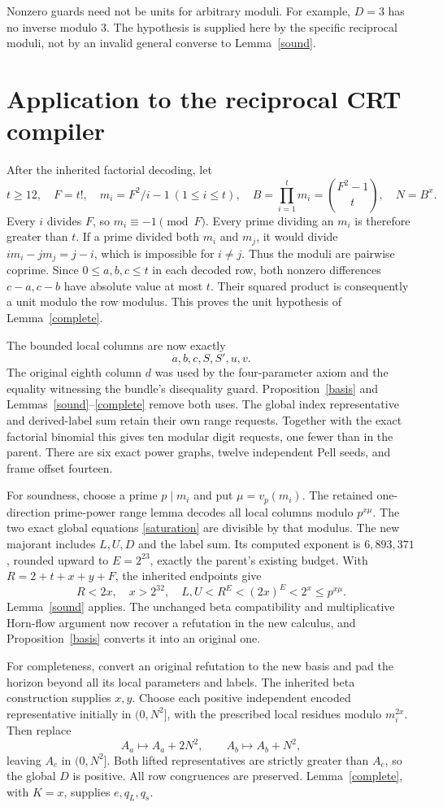 \documentclass[11pt]{article}
\begin{document}
Nonzero guards need not be units for arbitrary moduli. For example, $D=3$
has no inverse modulo 3. The hypothesis is supplied here by the specific
reciprocal moduli, not by an invalid general converse to Lemma~\ref{sound}.

\section{Application to the reciprocal CRT compiler}

After the inherited factorial decoding, let
\[
 t\ge12,\quad F=t!,\quad m_i=F^2/i-1\ (1\le i\le t),\quad
 B=\prod_{i=1}^t m_i=\binom{F^2-1}{t},\quad N=B^x.
\]
Every $i$ divides $F$, so $m_i\equiv-1\pmod F$. Every prime dividing an
$m_i$ is therefore greater than $t$. If a prime divided both $m_i$ and
$m_j$, it would divide $i m_i-jm_j=j-i$, which is impossible for $i\ne j$.
Thus the moduli are pairwise coprime. Since $0\le a,b,c\le t$ in each
decoded row, both nonzero differences $c-a,c-b$ have absolute value at most
$t$. Their squared product is consequently a unit modulo the row modulus.
This proves the unit hypothesis of Lemma~\ref{complete}.

The bounded local columns are now exactly
\[
 a,b,c,S,S',u,v.
\]
The original eighth column $d$ was used by the four-parameter axiom and
the equality witnessing the bundle's disequality guard. Proposition~\ref{basis}
and Lemmas~\ref{sound}--\ref{complete} remove both uses.
The global index representative and derived-label sum retain their own
range requests. Together with the exact factorial binomial this gives ten
modular digit requests, one fewer than in the parent. There are six exact
power graphs, twelve independent Pell seeds, and frame offset fourteen.

For soundness, choose a prime $p\mid m_i$ and put
$\mu=v_p(m_i)$. The retained one-direction prime-power range lemma decodes
all local columns modulo $p^{x\mu}$. The two exact global equations
\eqref{saturation} are divisible by that modulus. The new majorant includes
$L,U,D$ and the label sum. Its computed exponent is $6{,}893{,}371$,
rounded upward to $E=2^{23}$, exactly the parent's existing budget. With
$R=2+t+x+y+F$, the inherited endpoints give
\[
 R<2x,\quad x>2^{32},\quad L,U<R^E<(2x)^E<2^x\le p^{x\mu}.
\]
Lemma~\ref{sound} applies. The unchanged beta compatibility and
multiplicative Horn-flow argument now recover a refutation in the new
calculus, and Proposition~\ref{basis} converts it into an original one.

For completeness, convert an original refutation to the new basis and pad
the horizon beyond all its local parameters and labels. The inherited
beta construction supplies $x,y$. Choose each positive independent encoded
representative initially in $(0,N^2]$, with the prescribed local residues
modulo $m_i^{2x}$. Then replace
\begin{equation}\label{lifts}
 A_a\longmapsto A_a+2N^2,\qquad A_b\longmapsto A_b+N^2,
\end{equation}
leaving $A_c$ in $(0,N^2]$. Both lifted representatives are strictly greater
than $A_c$, so the global $D$ is positive. All row congruences are preserved.
Lemma~\ref{complete}, with $K=x$, supplies $e,q_L,q_s$.
\end{document}
